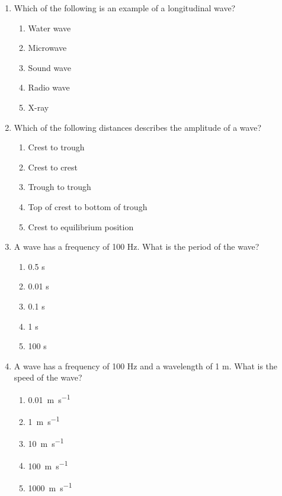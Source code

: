 \documentclass{../../../oss-apphys}
\begin{document}
\genheader


\genmultidirections

\gengravity

\raggedcolumns
\begin{multicols}{2}

  \begin{enumerate}[leftmargin=18pt]

  \item Which of the following is an example of a longitudinal wave?
    \begin{enumerate}[nosep,leftmargin=18pt,label=(\Alph*)]
    \item Water wave
    \item Microwave
    \item Sound wave
    \item Radio wave
    \item X-ray
    \end{enumerate}
    \vspace{.7in}
    
  \item Which of the following distances describes the amplitude of a wave?
    \begin{enumerate}[nosep,leftmargin=18pt,label=(\Alph*)]
    \item Crest to trough
    \item Crest to crest
    \item Trough to trough
    \item Top of crest to bottom of trough
    \item Crest to equilibrium position
    \end{enumerate}
    \vspace{.7in}
  \item A wave has a frequency of 100 Hz. What is the period of the wave?
    \begin{enumerate}[nosep,leftmargin=18pt,label=(\Alph*)]
    \item 0.5 s
    \item 0.01 s
    \item 0.1 s
    \item 1 s
    \item 100 s
    \end{enumerate}
    
  \item A wave has a frequency of 100 Hz and a wavelength of 1 m. What is
    the speed of the wave?
    \begin{enumerate}[nosep,leftmargin=18pt,label=(\Alph*)]
    \item\SI{.01}{\metre\per\second}
    \item\SI{1}{\metre\per\second}
    \item\SI{10}{\metre\per\second}
    \item\SI{100}{\metre\per\second}
    \item\SI{1000}{\metre\per\second}
    \end{enumerate}
    \columnbreak
    

\end{enumerate}
\end{multicols}
\end{document}
